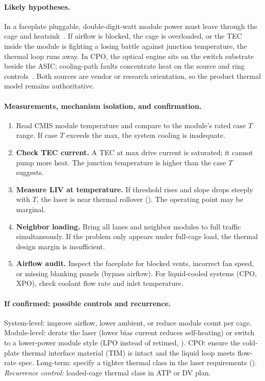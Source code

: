 \paragraph{Likely hypotheses.}
In a faceplate pluggable, double-digit-watt module power must leave through the
cage and heatsink~\cite{switchthermal}. If airflow is blocked, the cage is
overloaded, or the TEC inside the module is fighting a losing battle against
junction temperature, the thermal loop runs away. In CPO, the optical engine sits
on the switch substrate beside the ASIC; cooling-path faults concentrate heat on
the source and ring controls~\cite{cpocooling}. Both sources are vendor or
research orientation, so the product thermal model remains authoritative.

\paragraph{Measurements, mechanism isolation, and confirmation.}
\begin{enumerate}
\item Read CMIS module temperature and compare to the module's rated case $T$
      range. If case $T$ exceeds the max, the system cooling is inadequate.
\item \textbf{Check TEC current.} A TEC at max drive current is saturated; it
      cannot pump more heat. The junction temperature is higher than the case $T$
      suggests.
\item \textbf{Measure LIV at temperature.} If threshold rises and slope drops
      steeply with $T$, the laser is near thermal rollover ().
      The operating point may be marginal.
\item \textbf{Neighbor loading.} Bring all lanes and neighbor modules to full
      traffic simultaneously. If the problem only appears under full-cage load, the
      thermal design margin is insufficient.
\item \textbf{Airflow audit.} Inspect the faceplate for blocked vents, incorrect
      fan speed, or missing blanking panels (bypass airflow). For liquid-cooled
      systems (CPO, XPO), check coolant flow rate and inlet temperature.
\end{enumerate}

\paragraph{If confirmed: possible controls and recurrence.}
System-level: improve airflow, lower ambient, or reduce module count per cage.
Module-level: derate the laser (lower bias current reduces self-heating) or switch
to a lower-power module style (LPO instead of retimed, ).
CPO: ensure the cold-plate thermal interface material (TIM) is intact and the
liquid loop meets flow-rate spec. Long-term: specify a tighter thermal class in the
laser requirements ().
\emph{Recurrence control:} loaded-cage thermal class in ATP or DV plan.

